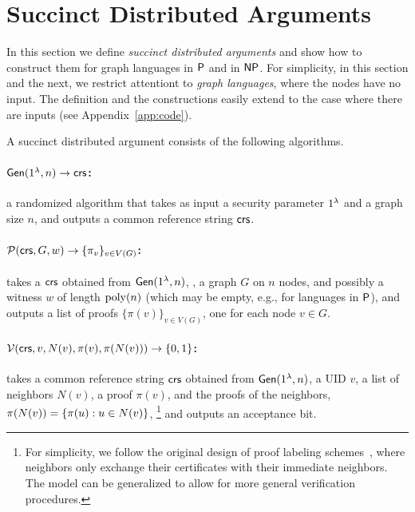 \section{Succinct Distributed Arguments}\label{sec:dargs}
In this section we define \emph{succinct distributed arguments} and show how to construct them for graph languages in
${\mathsf{P}}$ and in ${\mathsf{NP}}$.
For simplicity, in this section and the next,
we restrict attentiont to \emph{graph languages},
where the nodes have no input.
The definition and the constructions easily extend to the case where there are inputs
(see Appendix~\ref{app:code}).

A succinct distributed argument consists of the following algorithms.

\paragraph{$\mathsf{Gen}(1^\lambda, n)\to \mathit{ \mathsf{crs} }$:} a randomized algorithm that takes as input a security parameter $1^\lambda$ and a graph size $n$, and outputs a common reference string $\mathit{ \mathsf{crs} }$.

\paragraph{$\mathcal{P}(\mathit{ \mathsf{crs} }, G, w)\to \{\pi_v\}_{v\in V(G)}$:}
takes a $\mathit{ \mathsf{crs} }$ obtained from $\mathsf{Gen}(1^{\lambda}, n)$,
, %
a graph $G$ on $n$ nodes, and possibly a witness $w$ of length $\operatorname{poly}(n)$ (which may be empty, e.g., for languages in ${\mathsf{P}}$),
and outputs a list of proofs $\{\pi(v)\}_{v\in V(G)}$,
one for each node $v \in G$.

\paragraph{$\mathcal{V}(\mathit{ \mathsf{crs} }, v, N(v), \pi(v), \pi(N(v)) )\to \{0,1\}$:}
takes a common reference string $\mathsf{crs}$ obtained from $\mathsf{Gen}(1^{\lambda}, n)$,
a UID $v$, a list of neighbors $N(v)$, a proof $\pi(v)$,
and the proofs of the neighbors, $\pi(N(v)) = \left \{{ \pi(u) : u \in N(v) } \right \}$,%
\footnote{For simplicity, we follow the original design of proof labeling schemes~\cite{korman2005proof},
where neighbors only exchange their certificates with their immediate neighbors.
The model can be generalized to allow for more general verification procedures.}
and outputs an acceptance bit.

